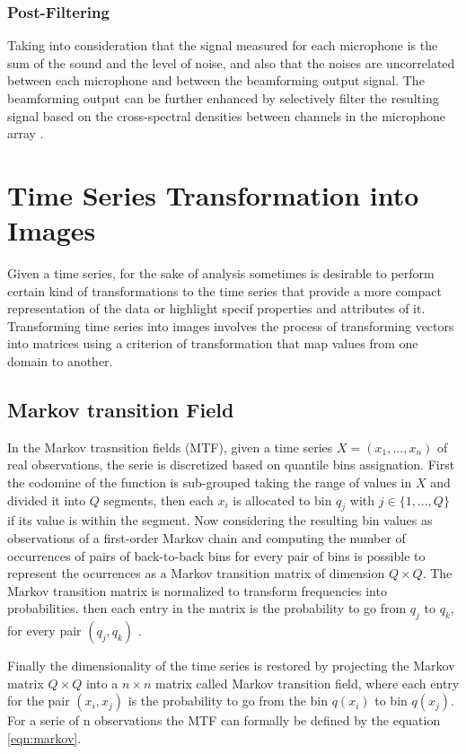 \subsubsection{Post-Filtering}

Taking into consideration that the signal measured for each microphone is the sum of the sound and the level of noise, and also that the noises are uncorrelated between each microphone and between the beamforming output signal. The beamforming output can be further enhanced by selectively filter the resulting signal based on the cross-spectral densities between channels in the microphone array \cite{BEA02}. 


\section{Time Series Transformation into Images}
Given a time series, for the sake of analysis sometimes is desirable to perform certain kind of transformations to the time series that provide a more compact representation of the data or highlight specif properties and attributes of it. Transforming time series into images involves the process of transforming vectors into matrices using a criterion of transformation that map values from one domain to another. 

\subsection{Markov transition Field}
In the Markov trasnsition fields (MTF), given a time series \(X=(x_1,...,x_n) \) of real observations, the serie is discretized based on quantile bins assignation. First the codomine of the function is sub-grouped taking the range of values in \(X\) and divided it into \(Q\) segments, then each \(x_i\) is allocated to bin \(q_j\) with \(j \in \{1,...,Q\}\) if its value is within the segment. Now considering the resulting bin values as observations of a first-order Markov chain and computing the number of occurrences of pairs of back-to-back bins for every pair of bins is possible to represent the ocurrences as a Markov transition matrix of dimension \(Q \times Q\). The Markov transition matrix is normalized to transform frequencies into probabilities. then each entry in the matrix is the probability to go from \(q_j\) to \(q_k\), for every pair \(( q_j,q_k)\) \cite{Faouzi24}. 

Finally the dimensionality of the time series is restored by projecting the Markov matrix \(Q \times Q\) into a \(n \times n\) matrix called Markov transition field, where each entry for the pair \((x_i,x_j)\) is the probability to go from the bin \(q(x_i)\) to bin \(q(x_j)\). For a serie of n observations the MTF can formally be defined by the equation \ref{eqn:markov}.


